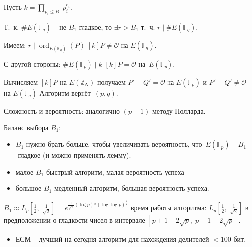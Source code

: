 \documentclass{beamer}
\begin{document}
\begin{frame}
\ProofBegin
Пусть $k = \prod\limits_{p_i \leq B_1} p_i^{e_i}$.

\vspace{0.5em}
Т.~к. $\#E(\mathbb{F}_q)$ -- не $B_1$-гладкое, то $\exists r > B_1$ т.~ч. $r \mid \#E(\mathbb{F}_q)$.

Имеем: $r \mid \operatorname{ord}_{E(\mathbb{F}_q)}(P)$ \MyImplies $[k] P \neq \mathcal{O}$ на $E(\mathbb{F}_q)$.
\vspace{0.5em}

С другой стороны: $\#E(\mathbb{F}_p) \mid k$ \MyImplies $[k]P = \mathcal{O}$ на~$E(\mathbb{F}_p)$.

Вычисляем $[k]P$ на $E(\mathbb{Z}_N)$ \MyImplies получаем $P' + Q' = \mathcal{O}$ на $E(\mathbb{F}_p)$ и $P' + Q' \neq \mathcal{O}$ на $E(\mathbb{F}_q)$ \MyImplies Алгоритм вернёт~$(p, q)$.

\vspace{0.5em}
Сложность и вероятность: аналогично $(p-1)$ методу Полларда. 
\ProofEnd
\end{frame}

\begin{frame}
 Баланс выбора $B_1$:
\begin{itemize}
	\item $B_1$ нужно брать больше, чтобы увеличивать вероятность, что~$E(\mathbb{F}_p)$ -- $B_1$-гладкое (и можно применять лемму).
    \item малое $B_1$ \structure{$\Rightarrow$} быстрый алгоритм, малая вероятность успеха 
    \item большое $B_1$ \structure{$\Rightarrow$} медленный алгоритм, большая вероятность успеха. 
\end{itemize}

 ${B_1} \approx {L_p}[ \frac{1}{2},\;\frac{1}{\sqrt 2 }] = e^{\frac{1}{\sqrt 2 }(\log p)^\frac{1}{2}(\log\log p)^\frac{1}{2}}$  \structure{$\Rightarrow$} время работы алгоритма: ${L_p}[ \frac{1}{2},\;\frac{1}{\sqrt 2 }]$ в предположении о гладкости чисел в интервале 
$[ {p + 1 - 2\sqrt p ,\;p + 1 + 2\sqrt p } ]$.
\begin{itemize}
    \item ЕСМ -- лучший на сегодня алгоритм для нахождения делителей $< 100$ бит.
\end{itemize} 
\end{frame}

\end{document}
